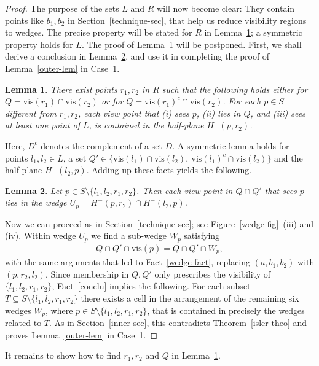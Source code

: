 \documentclass[11pt]{article}
\newtheorem{lemma}{Lemma}
\begin{document}
\begin{proof}
The purpose of the sets $L$ and $R$ will now become clear: They contain points 
like $b_1, b_2$ in Section~\ref{technique-sec}, that help us reduce visibility regions
to wedges. The precise property will be stated for $R$ in Lemma~\ref{case-lem};
a symmetric property holds for $L$. The proof of Lemma~\ref{case-lem} will be 
postponed. First, we shall derive a conclusion in Lemma~\ref{main-lem},
and use it in completing the proof of Lemma~\ref{outer-lem} in Case~1.


\begin{lemma}      \label{case-lem}
There exist points $r_1, r_2$ in $R$ such that the following holds either for $Q=\mbox{vis}(r_1) \cap \mbox{vis}(r_2)$ 
or for $Q= \mbox{vis}(r_1)^c \cap \mbox{vis}(r_2) $.
For each $p \in S$ different from $r_1, r_2$, 
each view point that (i) sees $p$, (ii) lies in $Q$, and (iii) sees at least one point of $L$, 
is contained in the half-plane $H^-(p,r_2)$.
\end{lemma}

Here, $D^c$ denotes the complement of a set $D$.
A symmetric lemma holds for points $l_1, l_2 \in L$, a set 
$Q' \in \{  \mbox{vis}(l_1) \cap \mbox{vis}(l_2), \  \mbox{vis}(l_1)^c \cap \mbox{vis}(l_2) \}$
and the half-plane $H^-(l_2,p)$. Adding up these facts yields the following.


\begin{lemma}     \label{main-lem}
Let $p \in S \setminus \{l_1, l_2, r_1, r_2\}$. Then each view point in $Q \cap Q'$ that 
sees $p$ lies in the wedge $U_p = H^-(p,r_2) \cap H^-(l_2,p)$.
\end{lemma}

Now we can proceed as in Section~\ref{technique-sec}; see Figure~\ref{wedge-fig}~(iii) and (iv).
Within wedge $U_p$ we find a sub-wedge $W_p$ satisfying
\begin{eqnarray}      \label{conclu}
   Q \cap Q'  \cap \mbox{vis}(p) =  Q \cap Q'  \cap  W_p,
\end{eqnarray} 
with the same arguments that led to Fact~\ref{wedge-fact}, replacing $(a, b_1, b_2)$ with
$(p, r_2, l_2)$. Since membership in $Q, Q'$ only prescribes the visibility of $\{l_1, l_2, r_1, r_2\}$,
Fact~\ref{conclu} implies the following. For each subset 
$T \subseteq S \setminus \{l_1, l_2, r_1, r_2\}$ there exists a cell in the arrangement of the remaining 
six wedges $W_p$, where $p\in S\setminus\{l_1,l_2,r_1,r_2\}$, that is contained in precisely the wedges related to $T$. 
As in Section~\ref{inner-sec}, this contradicts Theorem~\ref{isler-theo} and proves Lemma~\ref{outer-lem} in Case~1.
\end{proof}
It remains to show how to find $r_1, r_2$ and $Q$ in Lemma~\ref{case-lem}. 
\end{document}
